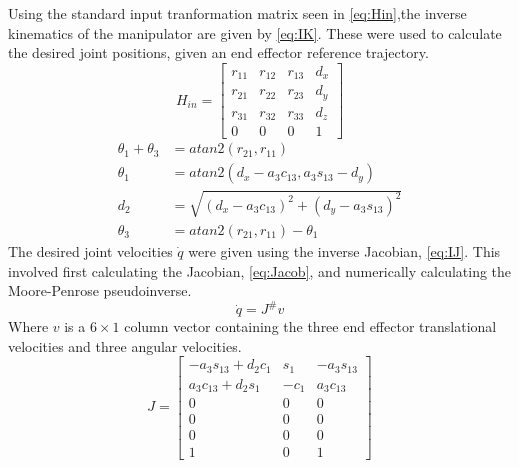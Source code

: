 \documentclass[letterpaper,12pt]{report}
\begin{document}
Using the standard input tranformation matrix seen in \eqref{eq:Hin},the inverse kinematics
of the manipulator are given by \eqref{eq:IK}. These were used to calculate the desired joint positions,
given an end effector reference trajectory.
\begin{equation}
H_{in} = 
	\begin{bmatrix}
		r_{11}&r_{12}&r_{13}&d_x\\
		r_{21}&r_{22}&r_{23}&d_y\\
		r_{31}&r_{32}&r_{33}&d_z\\
		0&0&0&1
	\end{bmatrix}
\label{eq:Hin}
\end{equation}
\begin{subequations}
	\begin{align}
		\theta_1 + \theta_3 &= atan2(r_{21},r_{11})\\
		\theta_1 &= atan2(d_x-a_3c_{13},a_3s_{13}-d_y)\\
		d_2 &= \sqrt{(d_x-a_3c_{13})^2+(d_y-a_3s_{13})^2}\\
		\theta_3 &= atan2(r_{21},r_{11}) - \theta_1
	\end{align}
\label{eq:IK}
\end{subequations}
The desired joint velocities $\dot q$ were given using the inverse Jacobian, \eqref{eq:IJ}.
This involved first calculating the Jacobian, \eqref{eq:Jacob}, and numerically calculating
the Moore-Penrose pseudoinverse.
\begin{equation}
\dot q = J^\#v
\label{eq:IJ}
\end{equation}
Where $v$ is a $6\times1$ column vector containing the three end effector translational velocities and three angular
velocities.
\begin{equation} \label{eq:Jacob}
J = 
	\begin{bmatrix}
		-a_3s_{13}+d_2c_1&s_1&-a_3s_{13}\\
		a_3c_{13}+d_2s_1&-c_1&a_3c_{13}\\
		0&0&0\\
		0&0&0\\
		0&0&0\\
		1&0&1
	\end{bmatrix}
\end{equation}
\end{document}
